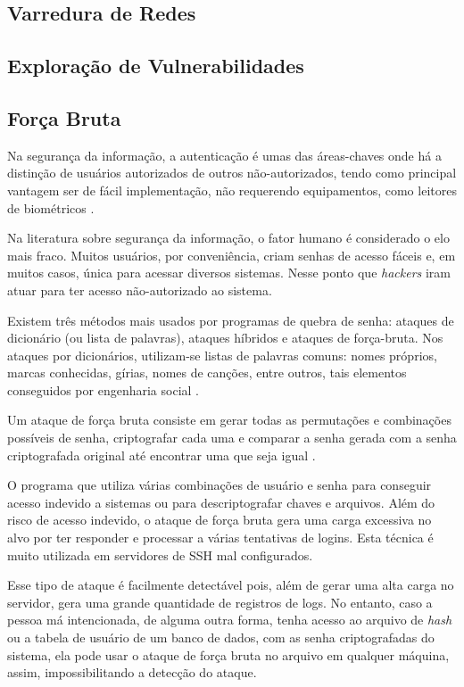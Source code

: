 \documentclass[
	12pt,				
	openright,		
	twoside,	
	a4paper,
	english,	
	brazil	
	]{abntex2}
\begin{document}
\subsection{Varredura de Redes} \label{sec:varredura}
\subsection{Exploração de Vulnerabilidades} \label{sec:exploração}
\subsection{Força Bruta} \label{sec:forçabruta}

Na segurança da informação, a autenticação é umas das áreas-chaves onde há a distinção de usuários autorizados de outros não-autorizados, tendo como principal vantagem ser de fácil implementação, não requerendo equipamentos, como leitores de biométricos \cite{denise-lilian}.

Na literatura sobre segurança da informação, o fator humano é considerado o elo mais fraco. Muitos usuários, por conveniência, criam senhas de acesso fáceis e, em muitos casos, única para acessar diversos sistemas. Nesse ponto que \textit{hackers} iram atuar para ter acesso não-autorizado ao sistema. 

Existem três métodos mais usados por programas de quebra de senha: ataques de dicionário (ou lista de palavras), ataques híbridos e ataques de força-bruta. Nos ataques por dicionários, utilizam-se listas de palavras comuns: nomes próprios, marcas conhecidas, gírias, nomes de canções, entre outros, tais elementos conseguidos por engenharia social \cite{univhacker}. 

 Um ataque de força bruta consiste em gerar todas as permutações e combinações possíveis de senha, criptografar cada uma e comparar a senha gerada com a senha criptografada original até encontrar uma que seja igual \cite{md5crack2012}. 

 O programa que utiliza várias combinações de usuário e senha para conseguir acesso indevido a sistemas ou para descriptografar chaves e arquivos. Além do risco de acesso indevido, o ataque de força bruta gera uma carga excessiva no alvo por ter responder e processar a várias tentativas de logins. Esta técnica é muito utilizada em servidores de SSH mal configurados. 

 Esse tipo de ataque é facilmente detectável pois, além de gerar uma alta carga no servidor, gera uma grande quantidade de registros de logs. No entanto, caso a pessoa má intencionada, de alguma outra forma, tenha acesso ao arquivo de \textit{hash} ou a tabela de usuário de um banco de dados, com as senha criptografadas do sistema, ela pode usar o ataque de força bruta no arquivo em qualquer máquina, assim, impossibilitando a detecção do ataque.
\end{document}
